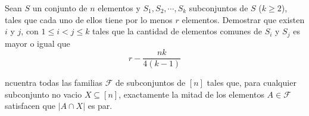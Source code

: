 \documentclass[11pt]{scrartcl}
\begin{document}
\begin{problem} %
    
    Sean $S$ un conjunto de $n$ elementos y $S_1, S_2, \cdots , S_k$ subconjuntos de $S$ ($k \geq 2$), tales que cada uno de ellos tiene por lo menos $r$ elementos. \newline 
Demostrar que existen $i$ y $j$, con $1 \leq i < j \leq k$ tales que la cantidad de elementos comunes de $S_i$ y $S_j$ es mayor o igual que
\[ r - \frac{nk}{4(k-1)} \]

    
\end{problem}

\begin{problem} %
    ncuentra todas las familias $\mathcal{F}$ de subconjuntos de $[n]$ tales que, para cualquier subconjunto no vacio $X\subseteq [n]$, exactamente la mitad de los elementos $A\in \mathcal{F}$ satisfacen que $|A\cap X|$ es par.
\end{problem}
\end{document}
